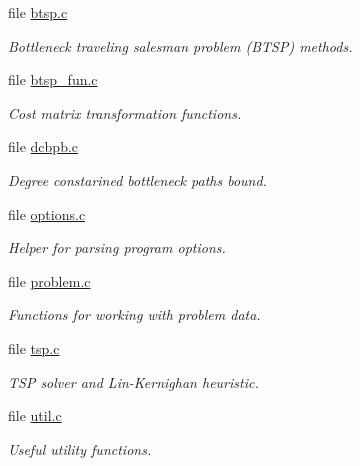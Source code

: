 \begin{CompactItemize}
\item 
file \hyperlink{lib_2btsp_8c}{btsp.c}
\begin{CompactList}\small\item\em Bottleneck traveling salesman problem (BTSP) methods. \item\end{CompactList}

\item 
file \hyperlink{btsp__fun_8c}{btsp\_\-fun.c}
\begin{CompactList}\small\item\em Cost matrix transformation functions. \item\end{CompactList}

\item 
file \hyperlink{lib_2dcbpb_8c}{dcbpb.c}
\begin{CompactList}\small\item\em Degree constarined bottleneck paths bound. \item\end{CompactList}

\item 
file \hyperlink{options_8c}{options.c}
\begin{CompactList}\small\item\em Helper for parsing program options. \item\end{CompactList}

\item 
file \hyperlink{problem_8c}{problem.c}
\begin{CompactList}\small\item\em Functions for working with problem data. \item\end{CompactList}

\item 
file \hyperlink{lib_2tsp_8c}{tsp.c}
\begin{CompactList}\small\item\em TSP solver and Lin-Kernighan heuristic. \item\end{CompactList}

\item 
file \hyperlink{util_8c}{util.c}
\begin{CompactList}\small\item\em Useful utility functions. \item\end{CompactList}

\end{CompactItemize}
